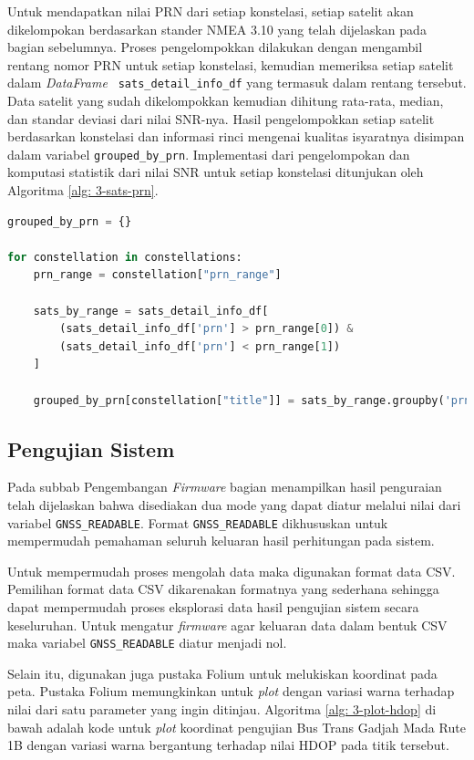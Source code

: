 Untuk mendapatkan nilai PRN dari setiap konstelasi, setiap satelit akan dikelompokan berdasarkan stander NMEA 3.10 yang telah dijelaskan pada bagian sebelumnya. Proses pengelompokkan dilakukan dengan mengambil rentang nomor PRN untuk setiap konstelasi, kemudian memeriksa setiap satelit dalam \textit{DataFrame} \texttt{ sats\_detail\_info\_df} yang termasuk dalam rentang tersebut. Data satelit yang sudah dikelompokkan kemudian dihitung rata-rata, median, dan standar deviasi dari nilai SNR-nya. Hasil pengelompokkan setiap satelit berdasarkan konstelasi dan informasi rinci mengenai kualitas isyaratnya disimpan dalam variabel \texttt{grouped\_by\_prn}. Implementasi dari pengelompokan dan komputasi statistik dari nilai SNR untuk setiap konstelasi ditunjukan oleh Algoritma \ref{alg: 3-sats-prn}.

\vspace{0.3cm}
\begin{lstlisting}[language=python, style=mystyle, caption={Mengelompokan Satelit Berdasarkan PRN-nya pada Python}, label={lst: 3-sats-prn}]
grouped_by_prn = {}

for constellation in constellations:
	prn_range = constellation["prn_range"]
	
	sats_by_range = sats_detail_info_df[
		(sats_detail_info_df['prn'] > prn_range[0]) & 
		(sats_detail_info_df['prn'] < prn_range[1])
	]
	
	grouped_by_prn[constellation["title"]] = sats_by_range.groupby('prn')['snr'].agg(['mean', 'median', 'std'])
\end{lstlisting}
\fi

\subsection{Pengujian Sistem}
Pada subbab Pengembangan \textit{Firmware} bagian menampilkan hasil penguraian telah dijelaskan bahwa disediakan dua mode yang dapat diatur melalui nilai dari variabel \texttt{GNSS\_READABLE}. Format \texttt{GNSS\_READABLE} dikhususkan untuk mempermudah pemahaman seluruh keluaran hasil perhitungan pada sistem.

Untuk mempermudah proses mengolah data maka digunakan format data CSV. Pemilihan format data CSV dikarenakan formatnya yang sederhana sehingga dapat mempermudah proses eksplorasi data hasil pengujian sistem secara keseluruhan. Untuk mengatur \textit{firmware} agar keluaran data dalam bentuk CSV maka variabel \texttt{GNSS\_READABLE} diatur menjadi nol.

Selain itu, digunakan juga pustaka Folium untuk melukiskan koordinat pada peta. Pustaka Folium memungkinkan untuk \textit{plot} dengan variasi warna terhadap nilai dari satu parameter yang ingin ditinjau. Algoritma \ref{alg: 3-plot-hdop} di bawah adalah kode untuk \textit{plot} koordinat pengujian Bus Trans Gadjah Mada Rute 1B dengan variasi warna bergantung terhadap nilai HDOP pada titik tersebut.

